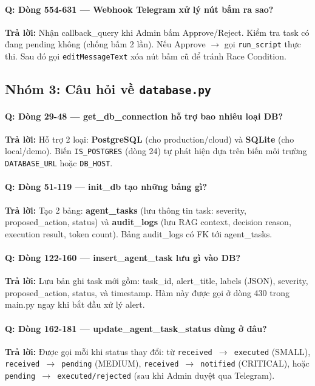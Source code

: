 \documentclass[12pt,a4paper]{article}
\begin{document}
\paragraph{Q: Dòng 554-631 — Webhook Telegram xử lý nút bấm ra sao?}
\textbf{Trả lời:} Nhận callback\_query khi Admin bấm Approve/Reject. Kiểm tra task có đang pending không (chống bấm 2 lần). Nếu Approve $\rightarrow$ gọi \texttt{run\_script} thực thi. Sau đó gọi \texttt{editMessageText} xóa nút bấm cũ để tránh Race Condition.

\subsection{Nhóm 3: Câu hỏi về \texttt{database.py}}

\paragraph{Q: Dòng 29-48 — get\_db\_connection hỗ trợ bao nhiêu loại DB?}
\textbf{Trả lời:} Hỗ trợ 2 loại: \textbf{PostgreSQL} (cho production/cloud) và \textbf{SQLite} (cho local/demo). Biến \texttt{IS\_POSTGRES} (dòng 24) tự phát hiện dựa trên biến môi trường \texttt{DATABASE\_URL} hoặc \texttt{DB\_HOST}.

\paragraph{Q: Dòng 51-119 — init\_db tạo những bảng gì?}
\textbf{Trả lời:} Tạo 2 bảng: \textbf{agent\_tasks} (lưu thông tin task: severity, proposed\_action, status) và \textbf{audit\_logs} (lưu RAG context, decision reason, execution result, token count). Bảng audit\_logs có FK tới agent\_tasks.

\paragraph{Q: Dòng 122-160 — insert\_agent\_task lưu gì vào DB?}
\textbf{Trả lời:} Lưu bản ghi task mới gồm: task\_id, alert\_title, labels (JSON), severity, proposed\_action, status, và timestamp. Hàm này được gọi ở dòng 430 trong main.py ngay khi bắt đầu xử lý alert.

\paragraph{Q: Dòng 162-181 — update\_agent\_task\_status dùng ở đâu?}
\textbf{Trả lời:} Được gọi mỗi khi status thay đổi: từ \texttt{received $\rightarrow$ executed} (SMALL), \texttt{received $\rightarrow$ pending} (MEDIUM), \texttt{received $\rightarrow$ notified} (CRITICAL), hoặc \texttt{pending $\rightarrow$ executed/rejected} (sau khi Admin duyệt qua Telegram).
\end{document}
